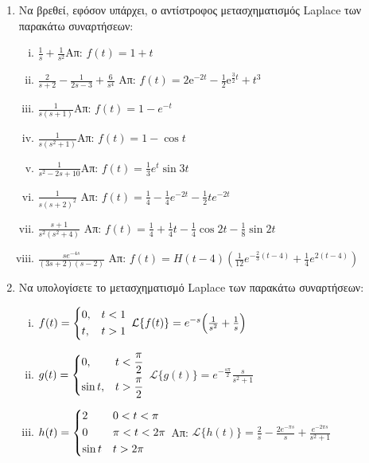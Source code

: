 \begin{enumerate}
  \item Να βρεθεί, εφόσον υπάρχει, ο αντίστροφος μετασχηματισμός Laplace των 
    παρακάτω συναρτήσεων:
    \begin{enumerate}[i)]
      \item $\frac{1}{s}+\frac{1}{s^2}$\hfill Απ: $f(t)=1+t$
      \item $ \frac{2}{s+2} - \frac{1}{2s-3} + \frac{6}{s^{4}} $ 
        \hfill Απ: $ f(t) = 2 \mathrm{e}^{-2t}-\frac{1}{2} \mathrm{e}^{\frac{3}{2} t} +
        t^{3}$  
      \item $\frac{1}{s(s+1)}$\hfill Απ: $f(t)=1-e^{-t}$
      \item $\frac{1}{s(s^2+1)}$\hfill Απ: $f(t)=1-\cos t$
      \item $\frac{1}{s^2-2s+10}$\hfill Απ: $f(t)=\frac{1}{3}e^t\sin 3t$
      \item $\frac{1}{s(s+2)^2}$
        \hfill Απ: $f(t)=\frac{1}{4}-\frac{1}{4}e^{-2t}-\frac{1}{2}te^{-2t}$
      \item $\frac{s+1}{s^{2}(s^{2}+4)}$ 
        \hfill Απ: $f(t)=\frac{1}{4}+\frac{1}{4}t-\frac{1}{4}\cos 2t -\frac{1}{8}\sin 2t$
      \item $\frac{se^{-4s}}{(3s+2)(s-2)}$ 
        \hfill Απ: $f(t)=H(t-4)\left(\frac{1}{12}e^{-\frac{2}{3}(t-4)}+
        \frac{1}{4}e^{2(t-4)}\right)$
    \end{enumerate}

  \item Να υπολογίσετε το μετασχηματισμό Laplace των παρακάτω συναρτήσεων:
    \begin{enumerate}[i)]
      \item $f(t)=
        \begin{dcases} 
          0, & t<1 \\ t, & t>1 
        \end{dcases}$ 
        \hfill $\mathcal{L}\{f(t)\}=e^{-s}\Bigl(\frac{1}{s^2}+\frac{1}{s}\Bigr)$

      \item $g(t)=
        \begin{dcases} 
          0, & t<\frac{\pi}{2} \\ \sin t, & t>\frac{\pi}{2}
        \end{dcases}$ 
        \hfill $\mathcal{L}\{g(t)\}=e^{-\frac{s\pi}{2}}\frac{s}{s^2+1}$

      \item $h(t)=
        \begin{dcases} 
          2 & 0 < t<\pi \\ 0 & \pi <t < 2\pi \\ \sin{t} & t > 2\pi
        \end{dcases}$ 
        \hfill Απ: $\mathcal{L}\{h(t)\}=\frac{2}{s}-\frac{2e^{-\pi s}}{s}+
        \frac{e^{-2\pi s}}{s^{2}+1}$


\end{enumerate}
\end{enumerate}
